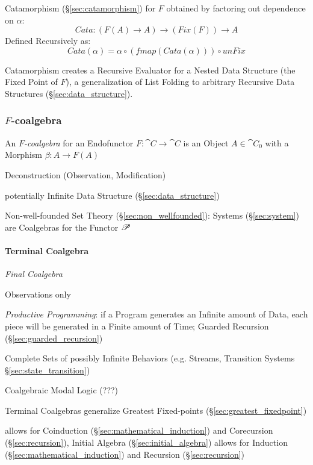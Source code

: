 Catamorphism (\S\ref{sec:catamorphism}) for $F$ obtained by factoring
out dependence on $\alpha$:
\[
  Cata : (F (A) \rightarrow A) \rightarrow (Fix (F)) \rightarrow A
\]
Defined Recursively as:
\[
  Cata (\alpha) = \alpha \circ (fmap (Cata (\alpha))) \circ unFix
\]

Catamorphism creates a Recursive Evaluator for a Nested Data Structure
(the Fixed Point of $F$), a generalization of List Folding to
arbitrary Recursive Data Structures (\S\ref{sec:data_structure}).



\subsubsection{$F$-coalgebra}\label{sec:f_coalgebra}

An \emph{$F$-coalgebra} for an Endofunctor $F : \cat{C} \rightarrow
\cat{C}$ is an Object $A \in \cat{C}_0$ with a Morphism $\beta : A
\rightarrow F(A)$ \cite{corfield08}

Deconstruction (Observation, Modification)

potentially Infinite Data Structure (\S\ref{sec:data_structure})

Non-well-founded Set Theory (\S\ref{sec:non_wellfounded}): Systems
(\S\ref{sec:system}) are Coalgebras for the Functor $\mathscr{P}$



\paragraph{Terminal Coalgebra}\label{sec:terminal_coalgebra}\hfill

\emph{Final Coalgebra}

Observations only

\emph{Productive Programming}: if a Program generates an Infinite
amount of Data, each piece will be generated in a Finite amount of
Time; Guarded Recursion (\S\ref{sec:guarded_recursion})
\cite{atkey-mcbride13}

Complete Sets of possibly Infinite Behaviors (e.g. Streams, Transition
Systems \S\ref{sec:state_transition})

Coalgebraic Modal Logic (???)

Terminal Coalgebras generalize Greatest Fixed-points
(\S\ref{sec:greatest_fixedpoint}) \cite{rutten00}

allows for Coinduction (\S\ref{sec:mathematical_induction}) and
Corecursion (\S\ref{sec:recursion}), Initial Algebra
(\S\ref{sec:initial_algebra}) allows for Induction
(\S\ref{sec:mathematical_induction}) and Recursion
(\S\ref{sec:recursion})

